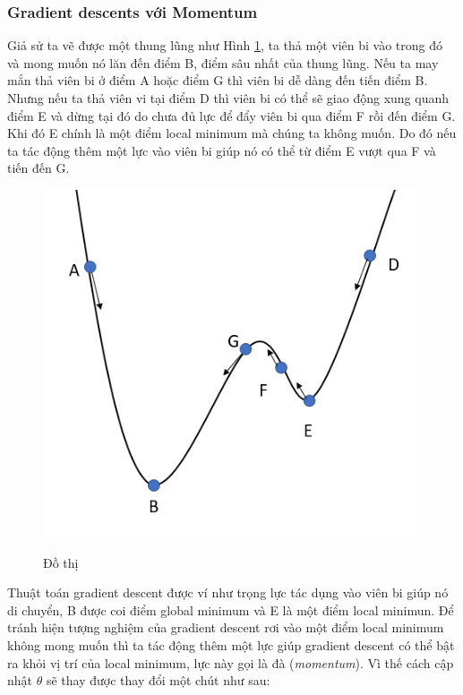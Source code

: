 \subsubsection{Gradient descents với Momentum}
\hspace{5mm}  Giả sử ta vẽ được một thung lũng như Hình \ref{fig:dothi}, ta thả một viên bi vào trong đó và mong muốn nó lăn đến điểm B, điểm sâu nhất của thung lũng. Nếu ta may mắn thả viên bi ở điểm A hoặc điểm G thì viên bi dễ dàng đến tiến điểm B. Nhưng nếu ta thả viên vi tại điểm D thì viên bi có thể sẽ giao động xung quanh điểm E và dừng tại đó do chưa đủ lực để đẩy viên bi qua điểm F rồi đến điểm G. Khi đó E chính là một điểm local minimum mà chúng ta không muốn. Do đó nếu ta tác động thêm một lực vào viên bi giúp nó có thể từ điểm E vượt qua F và tiến đến G. 
\begin{figure}[H]
\begin{center}
\label{fig:dothi}
\includegraphics[scale=1]{chap2/image/momentum.png}
\caption{Đồ thị }
\end{center}
\end{figure}
Thuật toán gradient descent được ví như trọng lực tác dụng vào viên bi giúp nó di chuyển, B được coi điểm global minimum và E là một điểm local minimun. Để tránh hiện tượng nghiệm của gradient descent rơi vào một điểm local minimum không mong muốn thì ta tác động thêm một lực giúp gradient descent có thể bật ra khỏi vị trí của local minimum, lực này gọi là đà (\textit{momentum}). Vì thế cách cập nhật $\theta$ sẽ thay được thay đổi một chút như sau:
